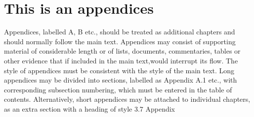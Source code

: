 \documentclass[../Thesis]{subfiles}
\begin{document}
\chapter{This is an appendices}
Appendices, labelled A, B etc., should be treated as additional chapters and should normally follow the main text. Appendices may consist of supporting material of considerable length or of lists, documents, commentaries, tables or other evidence that if included in the main text,would interrupt its flow. The style of appendices must be consistent with the style of the main text. Long appendices may be divided into sections, labelled as Appendix A.1 etc., with corresponding subsection numbering, which must be entered in the table of contents. Alternatively, short appendices may be attached to individual chapters, as an extra section with a heading of style 3.7 Appendix
\end{document}
